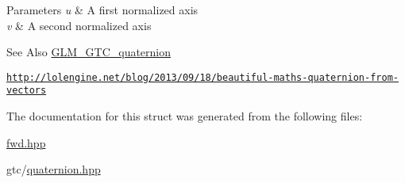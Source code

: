 \begin{DoxyParams}{Parameters}
{\em u} & A first normalized axis \\
\hline
{\em v} & A second normalized axis \\
\hline
\end{DoxyParams}
\begin{DoxySeeAlso}{See Also}
\hyperlink{group__gtc__quaternion}{G\-L\-M\-\_\-\-G\-T\-C\-\_\-quaternion} 

\href{http://lolengine.net/blog/2013/09/18/beautiful-maths-quaternion-from-vectors}{\tt http\-://lolengine.\-net/blog/2013/09/18/beautiful-\/maths-\/quaternion-\/from-\/vectors} 
\end{DoxySeeAlso}


The documentation for this struct was generated from the following files\-:\begin{DoxyCompactItemize}
\item 
\hyperlink{fwd_8hpp}{fwd.\-hpp}\item 
gtc/\hyperlink{gtc_2quaternion_8hpp}{quaternion.\-hpp}\end{DoxyCompactItemize}
